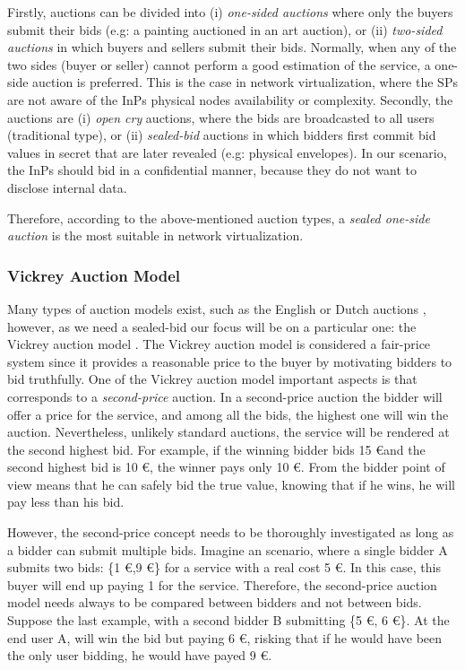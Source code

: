 Firstly, auctions can be divided into (i) \textit{one-sided auctions} where only the buyers submit their bids (e.g: a painting auctioned in an art auction), or (ii) \textit{two-sided auctions} in which buyers and sellers submit their bids. Normally, when any of the two sides (buyer or seller) cannot perform a good estimation of the service, a one-side auction is preferred. This is the case in network virtualization, where the SPs are not aware of the InPs physical nodes availability or complexity. Secondly, the auctions are (i) \textit{open cry} auctions, where the bids are broadcasted to all users (traditional type), or (ii) \textit{sealed-bid} auctions in which bidders first commit bid values in secret that are later revealed (e.g: physical envelopes). In our scenario, the InPs should bid in a confidential manner, because they do not want to disclose internal data. 

Therefore, according to the above-mentioned auction types, a \textit{sealed one-side auction} is the most suitable in network virtualization.

\subsubsection{Vickrey Auction Model} \label{vickrey}

Many types of auction models exist, such as the English or Dutch auctions \cite{coppinger1980incentives}, however, as we need a sealed-bid our focus will be on a particular one: the Vickrey auction model \cite{vickrey1961counterspeculation}. The Vickrey auction model is considered a fair-price system since it provides a reasonable price to the buyer by motivating bidders to bid truthfully. One of the Vickrey auction model important aspects is that corresponds to a \textit{second-price} auction. In a second-price auction the bidder will offer a price for the service, and among all the bids, the highest one will win the auction. Nevertheless, unlikely standard auctions, the service will be rendered at the second highest bid. For example, if the winning bidder bids 15 \euro and the second highest bid is 10 \euro, the winner pays only 10 \euro. From the bidder point of view means that he can safely bid the true value, knowing that if he wins, he will pay less than his bid. 

However, the second-price concept needs to be thoroughly investigated as long as a bidder can submit multiple bids. Imagine an scenario, where a single bidder A submits two bids: \{1 \euro,9 \euro\} for a service with a real cost 5 \euro. In this case, this buyer will end up paying 1 for the service. Therefore, the second-price auction model needs always to be compared between bidders and not between bids. Suppose the last example, with a second bidder B submitting \{5 \euro, 6 \euro\}. At the end user A, will win the bid but paying 6 \euro, risking that if he would have been the only user bidding, he would have payed 9 \euro.


